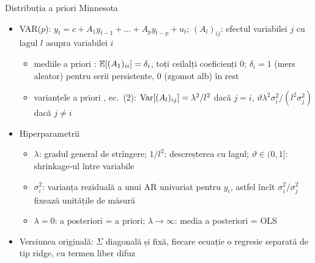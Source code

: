 \begin{frame}{Distribuția a priori Minnesota}
\itemsize{\small}
\begin{itemize}
    \item VAR($p$): $y_t = c + A_1y_{t-1} + \dots + A_py_{t-p} + u_t$; $(A_l)_{ij}$: efectul variabilei $j$ cu lagul $l$ asupra variabilei $i$
    \begin{itemize}
        \item mediile a priori : $\mathbb{E}[(A_1)_{ii}] = \delta_i$, toți ceilalți coeficienți 0; $\delta_i = 1$ (mers aleator) pentru serii persistente, 0 (zgomot alb) în rest
        \item varianțele a priori , ec.~(2): $\text{Var}[(A_l)_{ij}] = \lambda^2/l^2$ dacă $j = i$, $\vartheta\lambda^2\sigma_i^2/(l^2\sigma_j^2)$ dacă $j \ne i$
    \end{itemize}
    \item Hiperparametrii
    \begin{itemize}
        \item $\lambda$: gradul general de strîngere; $1/l^2$: descreșterea cu lagul; $\vartheta \in (0, 1]$: shrinkage-ul între variabile
        \item $\sigma_i^2$: varianța reziduală a unui AR univariat pentru $y_i$, astfel încît $\sigma_i^2/\sigma_j^2$ fixează unitățile de măsură
        \item $\lambda = 0$: a posteriori = a priori; $\lambda \to \infty$: media a posteriori = OLS
    \end{itemize}
    \item Versiunea originală: $\Sigma$ diagonală și fixă, fiecare ecuație o regresie separată de tip ridge, cu termen liber difuz
\end{itemize}
\end{frame}

